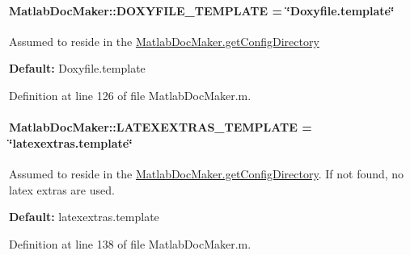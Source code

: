\paragraph[{D\+O\+X\+Y\+F\+I\+L\+E\+\_\+\+T\+E\+M\+P\+L\+A\+T\+E}]{\setlength{\rightskip}{0pt plus 5cm}Matlab\+Doc\+Maker\+::\+D\+O\+X\+Y\+F\+I\+L\+E\+\_\+\+T\+E\+M\+P\+L\+A\+T\+E = \char`\"{}Doxyfile.\+template\char`\"{}\hspace{0.3cm}{\ttfamily [static]}}\label{class_matlab_doc_maker_ab9514d0ba074c3b92a7fae2b50846b90}
Assumed to reside in the \hyperlink{class_matlab_doc_maker_a11a2a8ec616df969a911b325e39b0b4f}{Matlab\+Doc\+Maker.\+get\+Config\+Directory}

{\bfseries Default\+:} {\ttfamily Doxyfile.\+template} 

Definition at line 126 of file Matlab\+Doc\+Maker.\+m.

\hypertarget{class_matlab_doc_maker_a5fd9647b943b91d54acbfce17d0d7416}{}
\paragraph[{L\+A\+T\+E\+X\+E\+X\+T\+R\+A\+S\+\_\+\+T\+E\+M\+P\+L\+A\+T\+E}]{\setlength{\rightskip}{0pt plus 5cm}Matlab\+Doc\+Maker\+::\+L\+A\+T\+E\+X\+E\+X\+T\+R\+A\+S\+\_\+\+T\+E\+M\+P\+L\+A\+T\+E = \char`\"{}latexextras.\+template\char`\"{}\hspace{0.3cm}{\ttfamily [static]}}\label{class_matlab_doc_maker_a5fd9647b943b91d54acbfce17d0d7416}
Assumed to reside in the \hyperlink{class_matlab_doc_maker_a11a2a8ec616df969a911b325e39b0b4f}{Matlab\+Doc\+Maker.\+get\+Config\+Directory}. If not found, no latex extras are used.

{\bfseries Default\+:} {\ttfamily latexextras.\+template} 

Definition at line 138 of file Matlab\+Doc\+Maker.\+m.

\hypertarget{class_matlab_doc_maker_ab61ab79ccd92642c4fef74c6abbee559}{}
